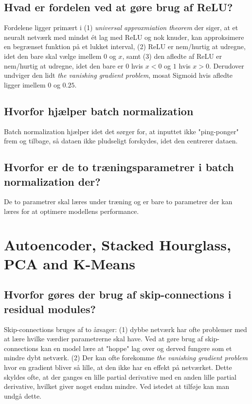 \documentclass[a4paper]{article}
\begin{document}
\subsection{Hvad er fordelen ved at gøre brug af ReLU?}
Fordelene ligger primært i (1) \textit{universal approxmiation theorem} der siger, at et neuralt netværk med mindst ét lag med ReLU og nok knuder, kan approksimere en begrænset funktion på et lukket interval, (2) ReLU er nem/hurtig at udregne, idet den bare skal vælge imellem $0$ og $x$, samt (3) den afledte af ReLU er nem/hurtig at udregne, idet den bare er $0$ hvis $x < 0$ og $1$ hvis $x > 0$. Derudover undviger den lidt \textit{the vanishing gradient problem}, mosat Sigmoid hvis afledte ligger imellem $0$ og $0.25$.

\subsection{Hvorfor hjælper batch normalization}
Batch normalization hjælper idet det sørger for, at inputtet ikke "ping-ponger" frem og tilbage, så dataen ikke pludseligt forskydes, idet den centrerer dataen.

\subsection{Hvorfor er de to træningsparametrer i batch normalization der?}
De to parametrer skal læres under træning og er bare to parametrer der kan læres for at optimere modellens performance.

\section{Autoencoder, Stacked Hourglass, PCA and K-Means}
\subsection{Hvorfor gøres der brug af skip-connections i residual modules?}
Skip-connections bruges af to årsager: (1) dybbe netværk har ofte problemer med at lære hvilke værdier parametrerne skal have. Ved at gøre brug af skip-connections kan en model lære at "hoppe" lag over og derved fungere som et mindre dybt netværk. (2) Der kan ofte forekomme \textit{the vanishing gradient problem} hvor en gradient bliver så lille, at den ikke har en effekt på netværket. Dette skyldes ofte, at der ganges en lille partial derivative med en anden lille partial derivative, hvilket giver noget endnu mindre. Ved istedet at tilføje kan man undgå dette.
\end{document}
